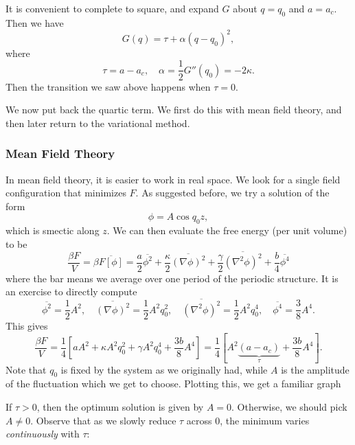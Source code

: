\documentclass[a4paper]{article}
\begin{document}
It is convenient to complete to square, and expand $G$ about $q = q_0$ and $a = a_c$. Then we have
\[
  G(q) = \tau + \alpha(q - q_0)^2,
\]
where
\[
  \tau = a - a_c,\quad \alpha = \frac{1}{2} G''(q_0) = - 2\kappa.
\]
Then the transition we saw above happens when $\tau = 0$.

We now put back the quartic term. We first do this with mean field theory, and then later return to the variational method.
\subsubsection*{Mean Field Theory}
In mean field theory, it is easier to work in real space. We look for a single field configuration that minimizes $F$. As suggested before, we try a solution of the form
\[
  \phi = A \cos q_0 z,
\]
which is smectic along $z$. We can then evaluate the free energy (per unit volume) to be
\[
  \frac{\beta F}{V} = \beta \overline{F[\phi]} = \frac{a}{2} \overline{\phi^2} + \frac{\kappa}{2} \overline{(\nabla \phi)^2} + \frac{\gamma}{2} \overline{(\nabla^2 \phi)^2} + \frac{b}{4} \overline{\phi^4}
\]
where the bar means we average over one period of the periodic structure. It is an exercise to directly compute
\[
  \overline{\phi^2} = \frac{1}{2} A^2,\quad \overline{(\nabla \phi)^2} = \frac{1}{2} A^2 q_0^2,\quad \overline{(\nabla^2 \phi)^2} =\frac{1}{2} A^2 q_0^4,\quad \overline{\phi^4} = \frac{3}{8} A^4.
\]
This gives
\[
  \frac{\beta F}{V} = \frac{1}{4} \left[aA^2 + \kappa A^2 q_0^2 + \gamma A^2 q_0^4 + \frac{3b}{8} A^4\right] = \frac{1}{4} \left[ A^2 \underbrace{(a - a_c)}_\tau + \frac{3b}{8} A^4\right].
\]
Note that $q_0$ is fixed by the system as we originally had, while $A$ is the amplitude of the fluctuation which we get to choose. Plotting this, we get a familiar graph
\begin{center}
\end{center}
If $\tau > 0$, then the optimum solution is given by $A = 0$. Otherwise, we should pick $A \not= 0$. Observe that as we slowly reduce $\tau$ across $0$, the minimum varies \emph{continuously} with $\tau$:
\begin{center}
\end{center}
\end{document}

